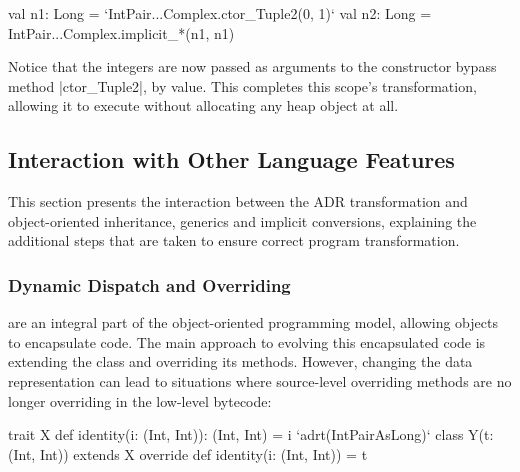 \begin{lstlisting-nobreak}
val n1: Long = `IntPair...Complex.ctor_Tuple2(0, 1)`
val n2: Long = IntPair...Complex.implicit_*(n1, n1)
\end{lstlisting-nobreak}

Notice that the integers are now passed as arguments to the constructor bypass method |ctor_Tuple2|, by value. This completes this scope's transformation, allowing it to execute without allocating any heap object at all.




\subsection{Interaction with Other Language Features}
\label{sec:ildl:language-features}

This section presents the interaction between the ADR transformation and object-oriented inheritance, generics and implicit conversions, explaining the additional steps that are taken to ensure correct program transformation. %

\subsubsection{Dynamic Dispatch and Overriding}
\label{sec:ildl:language-overriding}
are an integral part of the object-oriented programming model, allowing objects to encapsulate code. The main approach to evolving this encapsulated code is extending the class and overriding its methods. However, changing the data representation can lead to situations where source-level overriding methods are no longer overriding in the low-level bytecode:

\begin{lstlisting-nobreak}
trait X {
  def identity(i: (Int, Int)): (Int, Int) = i
}
`adrt(IntPairAsLong)` {
  class Y(t: (Int, Int)) extends X {
    override def identity(i: (Int, Int)) = t
  }
}
\end{lstlisting-nobreak}

